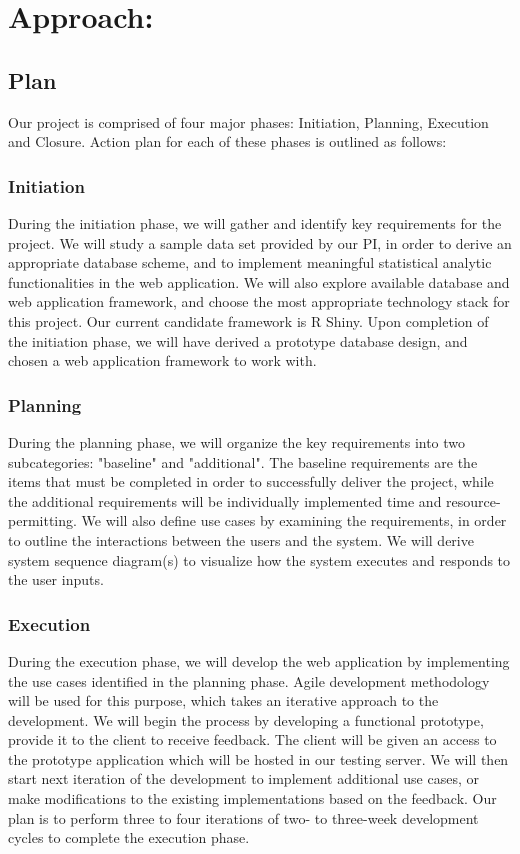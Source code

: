 \documentclass[10pt,twocolumn,letterpaper]{article}
\begin{document}
	   	\section{Approach:}

            \subsection{Plan}
            Our project is comprised of four major phases: Initiation, Planning, Execution and Closure. Action plan for each of these phases is outlined as follows:
                \subsubsection{Initiation}
                During the initiation phase, we will gather and identify key requirements for the project. 
                We will study a sample data set provided by our PI, in order to derive an appropriate database scheme, and to implement meaningful statistical analytic functionalities in the web application. 
                We will also explore available database and web application framework, and choose the most appropriate technology stack for this project. Our current candidate framework is R Shiny.
                Upon completion of the initiation phase, we will have derived a prototype database design, and chosen a web application framework to work with.
                \subsubsection{Planning}
                During the planning phase, we will organize the key requirements into two subcategories: "baseline" and "additional". 
                The baseline requirements are the items that must be completed in order to successfully deliver the project, while the additional requirements will be individually implemented time and resource-permitting. 
                We will also define use cases by examining the requirements, in order to outline the interactions between the users and the system. We will derive system sequence diagram(s) to visualize how the system executes and responds to the user inputs.
                \subsubsection{Execution}
                During the execution phase, we will develop the web application by implementing the use cases identified in the planning phase. 
                Agile development methodology will be used for this purpose, which takes an iterative approach to the development. 
                We will begin the process by developing a functional prototype, provide it to the client to receive feedback. 
                The client will be given an access to the prototype application which will be hosted in our testing server. 
                We will then start next iteration of the development to implement additional use cases, or make modifications to the existing implementations based on the feedback. Our plan is to perform three to four iterations of two- to three-week development cycles to complete the execution phase.
\end{document}
